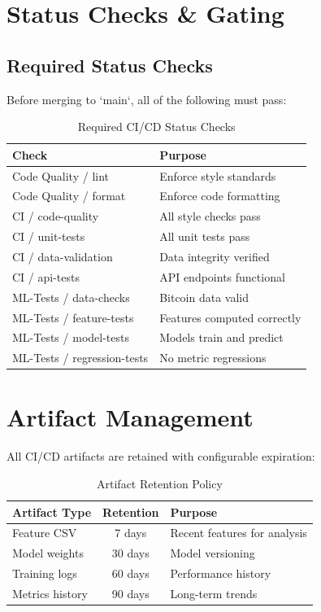 \section{Status Checks \& Gating}

\subsection{Required Status Checks}

Before merging to `main`, all of the following must pass:

\begin{table}[H]
\centering
\caption{Required CI/CD Status Checks}
\begin{tabularx}{\textwidth}{lX}
\toprule
\textbf{Check} & \textbf{Purpose} \\
\midrule
Code Quality / lint & Enforce style standards \\
Code Quality / format & Enforce code formatting \\
CI / code-quality & All style checks pass \\
CI / unit-tests & All unit tests pass \\
CI / data-validation & Data integrity verified \\
CI / api-tests & API endpoints functional \\
ML-Tests / data-checks & Bitcoin data valid \\
ML-Tests / feature-tests & Features computed correctly \\
ML-Tests / model-tests & Models train and predict \\
ML-Tests / regression-tests & No metric regressions \\
\bottomrule
\end{tabularx}
\end{table}

\section{Artifact Management}

All CI/CD artifacts are retained with configurable expiration:

\begin{table}[H]
\centering
\caption{Artifact Retention Policy}
\begin{tabularx}{\textwidth}{lcX}
\toprule
\textbf{Artifact Type} & \textbf{Retention} & \textbf{Purpose} \\
\midrule
Feature CSV & 7 days & Recent features for analysis \\
Model weights & 30 days & Model versioning \\
Training logs & 60 days & Performance history \\
Metrics history & 90 days & Long-term trends \\
\bottomrule
\end{tabularx}
\end{table}

